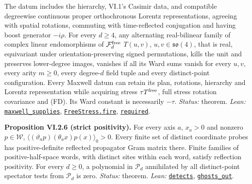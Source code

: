 \documentclass[
  letterpaper,
  11pt]{article}
\begin{document}
The datum includes the hierarchy, VI.1's Casimir data, and compatible
degreewise continuous proper orthochronous Lorentz representations,
agreeing with spatial rotations, commuting with time-reflected
conjugation and having boost generator \(-i\rho\). For every \(d\ge4\),
any alternating real-bilinear family of complex linear endomorphisms of
\(\mathcal F_d^{\rm free}\) \(T(u,v)\), \(u,v\in\mathfrak{so}(4)\), that
is real, equivariant under orientation-preserving signed permutations,
kills the unit and preserves lower-degree images, vanishes if all its
Ward sums vanish for every \(u,v\), every arity \(m\ge0\), every
degree-\(d\) field tuple and every distinct-point configuration. Every
Maxwell datum can retain its plan, rotations, hierarchy and Lorentz
representation while acquiring stress \(\tau T^{\rm free}\), full stress
rotation covariance and (FD). Its Ward constant is necessarily
\(-\tau\). \emph{Status:} theorem. \emph{Lean:}
\href{https://github.com/yang-mills-group/OpenAI-YM-20261028/blob/3456e5e75cf8d4cd558955a5c7638fba2d68f464/YM/Next/MAXWELL/Lit.lean\#L45-L48}{\texttt{maxwell\_supplies}},
\href{https://github.com/yang-mills-group/OpenAI-YM-20261028/blob/3456e5e75cf8d4cd558955a5c7638fba2d68f464/YM/UVNext/FREE_STRESS_CERTIFICATE/Choose.lean\#L137-L150}{\texttt{FreeStress.fire}},
\href{https://github.com/yang-mills-group/OpenAI-YM-20261028/blob/3456e5e75cf8d4cd558955a5c7638fba2d68f464/YM/UVNext/FREE_STRESS_CERTIFICATE/Pressure.lean\#L158-L161}{\texttt{required}}.

\textbf{Proposition VI.2.6 (strict positivity).} For every axis \(a\),
\(x_a>0\) and nonzero \(p\in\mathcal W\),
\(\langle(\vartheta_ap)(\theta_ax)p(x)\rangle_0>0\). Every finite set of
distinct coordinate probes has positive-definite reflected propagator
Gram matrix there. Finite families of positive-half-space words, with
distinct sites within each word, satisfy reflection positivity. For
every \(d\ge0\), a polynomial in \(\mathcal P_d\) annihilated by all
distinct-point spectator tests from \(\mathcal P_d\) is zero.
\emph{Status:} theorem. \emph{Lean:}
\href{https://github.com/yang-mills-group/OpenAI-YM-20261028/blob/3456e5e75cf8d4cd558955a5c7638fba2d68f464/YM/Next/MAXWELL/Core.lean\#L94-L110}{\texttt{detects}},
\href{https://github.com/yang-mills-group/OpenAI-YM-20261028/blob/3456e5e75cf8d4cd558955a5c7638fba2d68f464/YM/Next/MAXWELL/Statistic.lean\#L80-L99}{\texttt{ghosts\_out}}.
\end{document}

